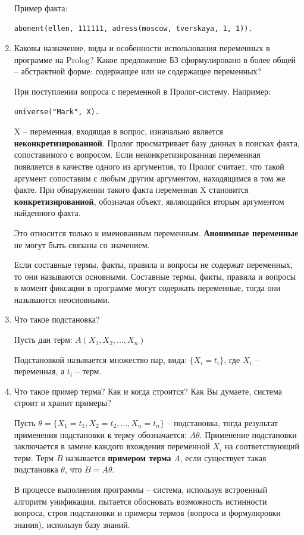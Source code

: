 \documentclass[a4paper,14pt]{extreport} %
\begin{document}
\begin{enumerate}
Пример факта:
\begin{lstlisting}
abonent(ellen, 111111, adress(moscow, tverskaya, 1, 1)).
\end{lstlisting}

\item Каковы назначение, виды и особенности использования переменных в программе на Prolog? Какое предложение БЗ сформулировано в более общей – абстрактной форме: содержащее или не содержащее переменных?

При поступлении вопроса с переменной в Пролог-систему. Например:
\begin{lstlisting}
universe("Mark", X).
\end{lstlisting}

X -- переменная, входящая в вопрос, изначально является \textbf{неконкретизированной}. Пролог просматривает базу данных в поисках факта, сопоставимого с вопросом. Если неконкретизированная переменная появляется в качестве одного из аргументов, то Пролог считает, что такой аргумент сопоставим с любым другим аргументом, находящимся в том же факте. При обнаружении такого факта переменная X становится \textbf{конкретизированной}, обозначая объект, являющийся вторым аргументом найденного факта.

Это относится только к именованным переменным. \textbf{Анонимные переменные} не могут быть связаны со значением.

Если составные термы, факты, правила и вопросы не содержат переменных, то они называются основными. Составные термы, факты, правила и вопросы в момент фиксации в программе могут содержать переменные, тогда они называются неосновными. 

\item Что такое подстановка?

Пусть дан терм: $A(X_1, X_2,..., X_n)$

Подстановкой называется множество пар, вида: $\{X_i = t_i\}$, 
где $X_i$ -- переменная, а $t_i$ -- терм.

\item Что такое пример терма? Как и когда строится? Как Вы думаете, система строит и хранит примеры?

Пусть $\theta = \{ X_1 = t_1, X_2= t_2, … , X_n = t_n \}$ -- подстановка,  тогда результат применения подстановки к терму обозначается: $A\theta$. Применение подстановки заключается в замене каждого вхождения переменной $X_i$  на соответствующий терм. Терм $B$ называется \textbf{примером терма} $A$, если существует такая подстановка $\theta$, что $B=A\theta$.

В процессе выполнения программы -- система, используя встроенный алгоритм унификации, пытается обосновать возможность истинности вопроса, строя подстановки и примеры термов (вопроса и формулировки знания), используя базу знаний. 

 \end{enumerate}
 
\end{document}
